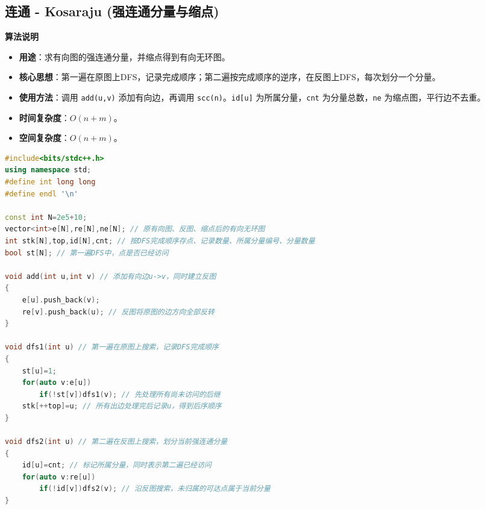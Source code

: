 \documentclass[10pt,landscape,a4paper]{article}
\begin{document}
\begin{multicols*}{3}
\subsection*{连通 - Kosaraju (强连通分量与缩点)}
\par\addvspace{0.7ex}\noindent\textbf{算法说明}\par\nobreak
\begin{itemize}
\item \textbf{用途}：求有向图的强连通分量，并缩点得到有向无环图。
\item \textbf{核心思想}：第一遍在原图上DFS，记录完成顺序；第二遍按完成顺序的逆序，在反图上DFS，每次划分一个分量。
\item \textbf{使用方法}：调用 \texttt{a\allowbreak{}d\allowbreak{}d\allowbreak{}(\allowbreak{}u\allowbreak{},\allowbreak{}v\allowbreak{})} 添加有向边，再调用 \texttt{s\allowbreak{}c\allowbreak{}c\allowbreak{}(\allowbreak{}n\allowbreak{})}。\texttt{i\allowbreak{}d\allowbreak{}[\allowbreak{}u\allowbreak{}]} 为所属分量，\texttt{c\allowbreak{}n\allowbreak{}t} 为分量总数，\texttt{n\allowbreak{}e} 为缩点图，平行边不去重。
\item \textbf{时间复杂度}：$O(n+m)$。
\item \textbf{空间复杂度}：$O(n+m)$。
\end{itemize}
\par{}\par
\begin{lstlisting}[language=C++]
#include<bits/stdc++.h>
using namespace std;
#define int long long
#define endl '\n'

const int N=2e5+10;
vector<int>e[N],re[N],ne[N]; // 原有向图、反图、缩点后的有向无环图
int stk[N],top,id[N],cnt; // 按DFS完成顺序存点、记录数量、所属分量编号、分量数量
bool st[N]; // 第一遍DFS中，点是否已经访问

void add(int u,int v) // 添加有向边u->v，同时建立反图
{
    e[u].push_back(v);
    re[v].push_back(u); // 反图将原图的边方向全部反转
}

void dfs1(int u) // 第一遍在原图上搜索，记录DFS完成顺序
{
    st[u]=1;
    for(auto v:e[u])
        if(!st[v])dfs1(v); // 先处理所有尚未访问的后继
    stk[++top]=u; // 所有出边处理完后记录u，得到后序顺序
}

void dfs2(int u) // 第二遍在反图上搜索，划分当前强连通分量
{
    id[u]=cnt; // 标记所属分量，同时表示第二遍已经访问
    for(auto v:re[u])
        if(!id[v])dfs2(v); // 沿反图搜索，未归属的可达点属于当前分量
}


\end{lstlisting}
\end{multicols*}
\end{document}
